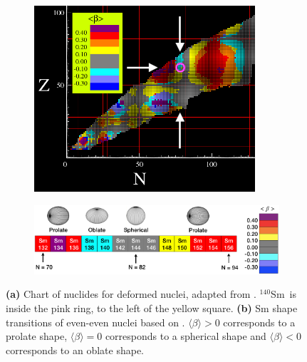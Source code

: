 \documentclass[twoside,english]{uiofysmaster/uiofysmaster}
\newcommand{\Sm}{$^{140}$Sm} %
\begin{document}
\begin{figure}[htb]
	\centering
	\begin{subfigure}{\textwidth}
		\centering
		\includegraphics[width=0.9\textwidth]{Images/cea-CoN-adjusted.png}
		\caption{}
		\label{fig:cea_CoN}
	\end{subfigure}
	\begin{subfigure}{\textwidth}
		\centering
		\includegraphics[width=\textwidth]{Images/Sm-shapes.png}
		\caption{}
		\label{fig:Sm-shapes}
	\end{subfigure}
	\caption{\textbf{(a)} Chart of nuclides for deformed nuclei, adapted from \cite{Hilaire2007, CEA}. \Sm\ is inside the pink ring, to the left of the yellow square.
	 \textbf{(b)} Sm shape transitions of even-even nuclei based on \cite{Hilaire2007, CEA}.
	 $\langle \beta \rangle > 0$ corresponds to a prolate shape, $\langle \beta \rangle = 0$ corresponds to a spherical shape and $\langle \beta \rangle < 0$ corresponds to an oblate shape.}
	\label{fig:deformation}
\end{figure}



\bigskip
\end{document}
